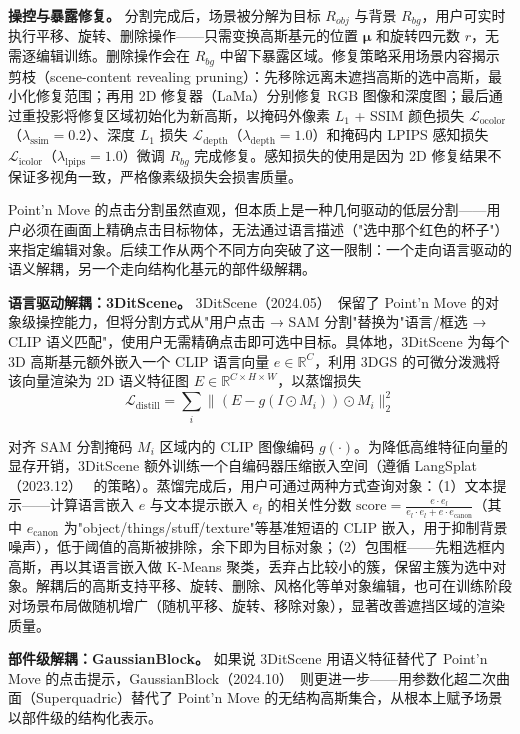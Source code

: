 \textbf{操控与暴露修复。} 分割完成后，场景被分解为目标 $R_{obj}$ 与背景 $R_{bg}$，用户可实时执行平移、旋转、删除操作——只需变换高斯基元的位置 $\boldsymbol{\mu}$ 和旋转四元数 $r$，无需逐编辑训练。删除操作会在 $R_{bg}$ 中留下暴露区域。修复策略采用场景内容揭示剪枝（scene-content revealing pruning）：先移除远离未遮挡高斯的选中高斯，最小化修复范围；再用 2D 修复器（LaMa）分别修复 RGB 图像和深度图；最后通过重投影将修复区域初始化为新高斯，以掩码外像素 $L_1$ + SSIM 颜色损失 $\mathcal{L}_{\text{ocolor}}$（$\lambda_{\text{ssim}}=0.2$）、深度 $L_1$ 损失 $\mathcal{L}_{\text{depth}}$（$\lambda_{\text{depth}}=1.0$）和掩码内 LPIPS 感知损失 $\mathcal{L}_{\text{icolor}}$（$\lambda_{\text{lpips}}=1.0$）微调 $R_{bg}$ 完成修复。感知损失的使用是因为 2D 修复结果不保证多视角一致，严格像素级损失会损害质量。

Point'n Move 的点击分割虽然直观，但本质上是一种几何驱动的低层分割——用户必须在画面上精确点击目标物体，无法通过语言描述（"选中那个红色的杯子"）来指定编辑对象。后续工作从两个不同方向突破了这一限制：一个走向语言驱动的语义解耦，另一个走向结构化基元的部件级解耦。

\textbf{语言驱动解耦：3DitScene。} 3DitScene（2024.05）~\cite{2405_18424}保留了 Point'n Move 的对象级操控能力，但将分割方式从"用户点击 → SAM 分割"替换为"语言/框选 → CLIP 语义匹配"，使用户无需精确点击即可选中目标。具体地，3DitScene 为每个 3D 高斯基元额外嵌入一个 CLIP 语言向量 $e \in \mathbb{R}^C$，利用 3DGS 的可微分泼溅将该向量渲染为 2D 语义特征图 $E \in \mathbb{R}^{C \times H \times W}$，以蒸馏损失
\begin{equation}
\mathcal{L}_{\text{distill}} = \sum_i \|(E - g(I \odot M_i)) \odot M_i\|_2^2
\end{equation}

对齐 SAM 分割掩码 $M_i$ 区域内的 CLIP 图像编码 $g(\cdot)$。为降低高维特征向量的显存开销，3DitScene 额外训练一个自编码器压缩嵌入空间（遵循 LangSplat（2023.12）~\cite{Qin2023LangSplat} 的策略）。蒸馏完成后，用户可通过两种方式查询对象：（1）文本提示——计算语言嵌入 $e$ 与文本提示嵌入 $e_l$ 的相关性分数 $\text{score} = \frac{e \cdot e_l}{e_l \cdot e_l + e \cdot e_{\text{canon}}}$（其中 $e_{\text{canon}}$ 为"object/things/stuff/texture"等基准短语的 CLIP 嵌入，用于抑制背景噪声），低于阈值的高斯被排除，余下即为目标对象；（2）包围框——先粗选框内高斯，再以其语言嵌入做 K-Means 聚类，丢弃占比较小的簇，保留主簇为选中对象。解耦后的高斯支持平移、旋转、删除、风格化等单对象编辑，也可在训练阶段对场景布局做随机增广（随机平移、旋转、移除对象），显著改善遮挡区域的渲染质量。

\textbf{部件级解耦：GaussianBlock。} 如果说 3DitScene 用语义特征替代了 Point'n Move 的点击提示，GaussianBlock（2024.10）~\cite{2410_01535}则更进一步——用参数化超二次曲面（Superquadric）替代了 Point'n Move 的无结构高斯集合，从根本上赋予场景以部件级的结构化表示。

